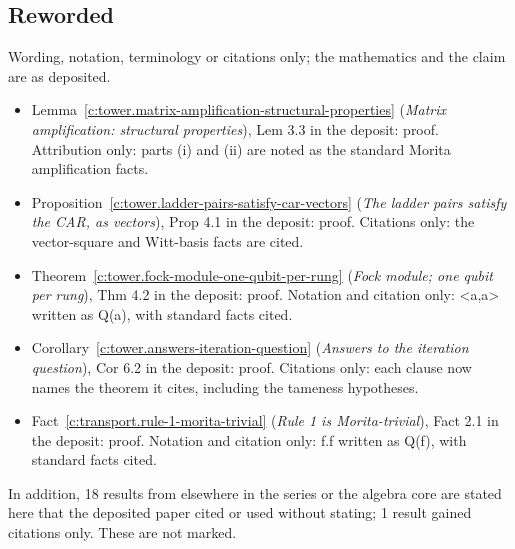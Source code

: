 \documentclass[11pt]{article}
\theoremstyle{definition}
\theoremstyle{plain}
\begin{document}
\subsection*{Reworded}
Wording, notation, terminology or citations only; the mathematics and the claim are as deposited.
\begin{itemize}\setlength{\itemsep}{2pt}
\item Lemma~\ref{c:tower.matrix-amplification-structural-properties} (\emph{Matrix amplification: structural properties}), Lem 3.3 in the deposit: proof. Attribution only: parts (i) and (ii) are noted as the standard Morita amplification facts.
\item Proposition~\ref{c:tower.ladder-pairs-satisfy-car-vectors} (\emph{The ladder pairs satisfy the CAR, as vectors}), Prop 4.1 in the deposit: proof. Citations only: the vector-square and Witt-basis facts are cited.
\item Theorem~\ref{c:tower.fock-module-one-qubit-per-rung} (\emph{Fock module; one qubit per rung}), Thm 4.2 in the deposit: proof. Notation and citation only: <a,a> written as Q(a), with standard facts cited.
\item Corollary~\ref{c:tower.answers-iteration-question} (\emph{Answers to the iteration question}), Cor 6.2 in the deposit: proof. Citations only: each clause now names the theorem it cites, including the tameness hypotheses.
\item Fact~\ref{c:transport.rule-1-morita-trivial} (\emph{Rule 1 is Morita-trivial}), Fact 2.1 in the deposit: proof. Notation and citation only: f.f written as Q(f), with standard facts cited.
\end{itemize}
\noindent In addition, 18 results from elsewhere in the series or the algebra core are stated here that the deposited paper cited or used without stating; 1 result gained citations only. These are not marked.
\end{document}
